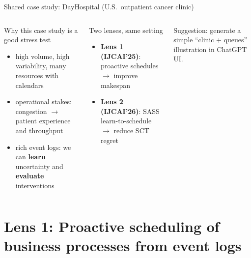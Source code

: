 \documentclass[aspectratio=169,10pt]{beamer}
\newcommand{\btext}[1]{\textbf{\color{darkred}#1}}
\begin{document}
\begin{frame}{Shared case study: DayHospital (U.S.\ outpatient cancer clinic)}
  \begin{columns}[T]
      \begin{block}{Why this case study is a good stress test}
        \begin{itemize}
          \item high volume, high variability, many resources with calendars
          \item operational stakes: congestion \(\rightarrow\) patient experience and throughput
          \item rich event logs: we can \btext{learn} uncertainty and \btext{evaluate} interventions
        \end{itemize}
      \end{block}

      \begin{block}{Two lenses, same setting}
        \begin{itemize}
          \item \btext{Lens 1 (IJCAI'25)}: proactive schedules \(\rightarrow\) improve makespan
          \item \btext{Lens 2 (IJCAI'26)}: SASS learn-to-schedule \(\rightarrow\) reduce SCT regret
        \end{itemize}
      \end{block}

      \centering
      \vspace{0.1cm}
      \scriptsize
      Suggestion: generate a simple ``clinic + queues'' illustration in ChatGPT UI.
  \end{columns}
\end{frame}

\section{Lens 1: Proactive scheduling of business processes from event logs}
\end{document}
